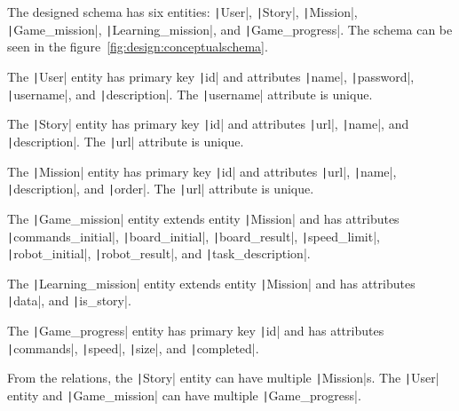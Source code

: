 The designed schema has six entities: \texttt|User|, \texttt|Story|, \texttt|Mission|, \linebreak\texttt|Game_mission|, \texttt|Learning_mission|, and \texttt|Game_progress|.
The schema can be seen in the figure~\ref{fig:design:conceptualschema}.

The \texttt|User| entity has primary key \texttt|id| and attributes \texttt|name|, \linebreak\texttt|password|, \texttt|username|, and \texttt|description|.
The \texttt|username| attribute is unique.

The \texttt|Story| entity has primary key \texttt|id| and attributes \texttt|url|, \texttt|name|, and \texttt|description|.
The \texttt|url| attribute is unique.

The \texttt|Mission| entity has primary key \texttt|id| and attributes \texttt|url|, \texttt|name|, \linebreak\texttt|description|, and \texttt|order|.
The \texttt|url| attribute is unique.

The \texttt|Game_mission| entity extends entity \texttt|Mission| and has attributes \linebreak\texttt|commands_initial|, \texttt|board_initial|, \texttt|board_result|, \texttt|speed_limit|, \linebreak\texttt|robot_initial|, \texttt|robot_result|, and \texttt|task_description|.

The \texttt|Learning_mission| entity extends entity \texttt|Mission| and has attributes \texttt|data|, and \texttt|is_story|.

The \texttt|Game_progress| entity has primary key \texttt|id| and has attributes \texttt|commands|, \texttt|speed|, \texttt|size|, and \texttt|completed|.

From the relations, the \texttt|Story| entity can have multiple \texttt|Mission|s.
The \texttt|User| entity and \texttt|Game_mission| can have multiple \texttt|Game_progress|.

